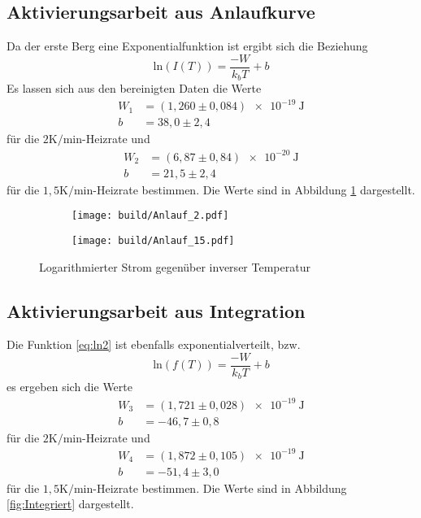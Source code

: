 \subsection{Aktivierungsarbeit aus Anlaufkurve}
Da der erste Berg eine Exponentialfunktion ist ergibt sich die Beziehung
\begin{equation}
  \text{ln}(I(T)) = \frac{-W}{k_bT} + b
\end{equation}
Es lassen sich aus den bereinigten Daten die Werte
\begin{align}
  W_1 &= (1,260\pm 0,084)\SI{e-19}{\joule}\nonumber\\
  b &= 38,0\pm 2,4
\end{align}
für die $2\si{\kelvin\per\minute}$-Heizrate und
\begin{align}
  W_2 &= (6,87\pm 0,84)\SI{e-20}{\joule}\nonumber\\
  b &= 21,5\pm 2,4
\end{align}
für die $1,5\si{\kelvin\per\minute}$-Heizrate bestimmen.
Die Werte sind in Abbildung \ref{fig:Anlauf} dargestellt.

\begin{figure}
  \centering
  \begin{subfigure}{0.4\textwidth}
    \centering
    \texttt{[image: build/Anlauf\_2.pdf]}
  \end{subfigure}
  \begin{subfigure}{0.4\textwidth}
    \centering
    \texttt{[image: build/Anlauf\_15.pdf]}
  \end{subfigure}
  \caption{Logarithmierter Strom gegenüber inverser Temperatur}
  \label{fig:Anlauf}
\end{figure}

\subsection{Aktivierungsarbeit aus Integration}
Die Funktion \eqref{eq:ln2} ist ebenfalls exponentialverteilt, bzw.
\begin{equation}
  \text{ln}(f(T)) = \frac{-W}{k_bT} + b
\end{equation}
es ergeben sich die Werte
\begin{align}
  W_3 &= (1,721\pm 0,028)\SI{e-19}{\joule}\nonumber\\
  b &= -46,7\pm 0,8
\end{align}
für die $2\si{\kelvin\per\minute}$-Heizrate und
\begin{align}
  W_4 &= (1,872\pm 0,105)\SI{e-19}{\joule}\nonumber\\
  b &= -51,4\pm 3,0
\end{align}
für die $1,5\si{\kelvin\per\minute}$-Heizrate bestimmen.
Die Werte sind in Abbildung \ref{fig:Integriert} dargestellt.

